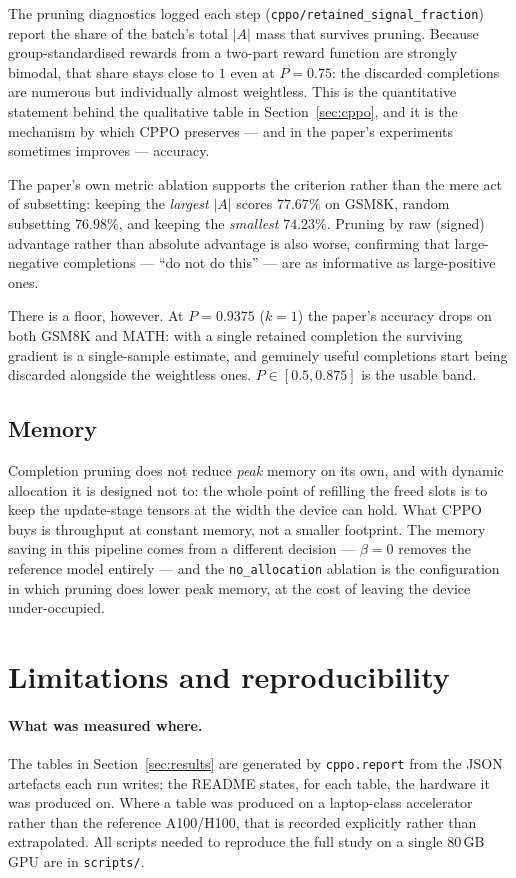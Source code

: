 \documentclass[11pt,a4paper]{article}
\newcommand{\Adv}{A}
\begin{document}
The pruning diagnostics logged each step (\texttt{cppo/retained\_signal\_fraction})
report the share of the batch's total $|\Adv|$ mass that survives pruning.
Because group-standardised rewards from a two-part reward function are
strongly bimodal, that share stays close to $1$ even at $P = 0.75$: the
discarded completions are numerous but individually almost weightless. This is
the quantitative statement behind the qualitative table in
Section~\ref{sec:cppo}, and it is the mechanism by which CPPO preserves --- and
in the paper's experiments sometimes improves --- accuracy.

The paper's own metric ablation supports the criterion rather than the mere
act of subsetting: keeping the \emph{largest} $|\Adv|$ scores $77.67\%$ on
GSM8K, random subsetting $76.98\%$, and keeping the \emph{smallest}
$74.23\%$. Pruning by raw (signed) advantage rather than absolute advantage is
also worse, confirming that large-negative completions --- ``do not do this''
--- are as informative as large-positive ones.

There is a floor, however. At $P = 0.9375$ ($k=1$) the paper's accuracy drops
on both GSM8K and MATH: with a single retained completion the surviving
gradient is a single-sample estimate, and genuinely useful completions start
being discarded alongside the weightless ones. $P \in [0.5, 0.875]$ is the
usable band.

\subsection{Memory}

Completion pruning does not reduce \emph{peak} memory on its own, and with
dynamic allocation it is designed not to: the whole point of refilling the
freed slots is to keep the update-stage tensors at the width the device can
hold. What CPPO buys is throughput at constant memory, not a smaller
footprint. The memory saving in this pipeline comes from a different decision
--- $\beta = 0$ removes the reference model entirely --- and the
\texttt{no\_allocation} ablation is the configuration in which pruning does
lower peak memory, at the cost of leaving the device under-occupied.

\section{Limitations and reproducibility}
\label{sec:limitations}

\paragraph{What was measured where.} The tables in
Section~\ref{sec:results} are generated by \texttt{cppo.report} from the JSON
artefacts each run writes; the README states, for each table, the hardware it
was produced on. Where a table was produced on a laptop-class accelerator
rather than the reference A100/H100, that is recorded explicitly rather than
extrapolated. All scripts needed to reproduce the full study on a single
80\,GB GPU are in \texttt{scripts/}.
\end{document}
